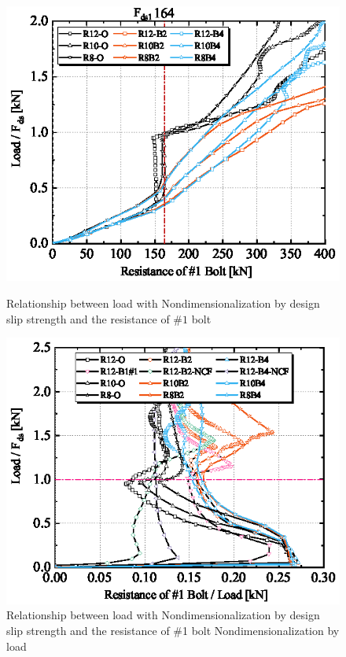 \begin{figure}[htbp]
\begin{minipage}[t]{0.49\linewidth}
    \centering
    \includegraphics[width=\linewidth]{imgs/ch5/Load-non-1BS.eps}
    \caption{Relationship between load with Nondimensionalization by design slip strength and the resistance of $\#1$ bolt}
    \label{fig-load-non-1bs}
\end{minipage}
\hspace{0.01\textwidth}
\begin{minipage}[t]{0.49\linewidth}
    \centering
    \includegraphics[width=\linewidth]{imgs/ch5/Load-1BS-alnon.eps}
    \caption{Relationship between load with Nondimensionalization by design slip strength and the resistance of \#1 bolt Nondimensionalization by load}
    \label{fig-load-1bs-alnon}
\end{minipage}
\end{figure}


